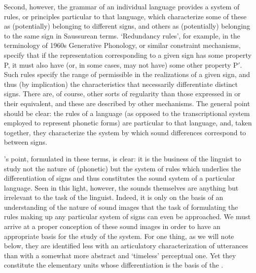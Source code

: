 Second, however, the grammar of an individual language provides a
system of {rules}, or principles particular to that language, which
characterize some of these  as (potentially) belonging
to different signs, and others as (potentially) belonging to the same
sign in Saussurean terms. `Redundancy {rules}', for example, in the
terminology of 1960s Generative Phonology, or similar constraint
mechanisms, specify that if the representation corresponding to a
given sign has some property P, it must also have (or, in some cases,
may not have) some other property P$\prime$. Such {rules} specify the
range of permissible  in the realizations of a given sign,
and thus (by implication) the characteristics that necessarily
differentiate distinct signs. There are, of course, other sorts of
regularity than those expressed in  or their
equivalent, and these are described by other mechanisms. The general
point should be clear: the {rules} of a language (as opposed to the
transcriptional system employed to represent phonetic forms) are
particular to that language, and, taken together, they characterize
the system by which sound differences correspond to 
between signs.

{\Saussure}'s point, formulated in these terms, is clear: it is the
business of the linguist to study not the nature of (phonetic)
 but the system of {rules} which underlies the
differentiation of signs and thus constitutes the sound system of a
particular language. Seen in this light, however, the sounds
themselves are anything but irrelevant to the task of the
linguist. Indeed, it is only on the basis of an understanding of the
nature of sound images that the task of formulating the {rules} making
up any particular system of signs can even be approached. We must
arrive at a proper conception of these sound images in order to have
an appropriate basis for the study of the system. For one thing, as we
will note below, they are identified less with an articulatory
characterization of utterances than with a somewhat more abstract and
`timeless' perceptual one. Yet they constitute the elementary units
whose differentiation is the basis of the .

